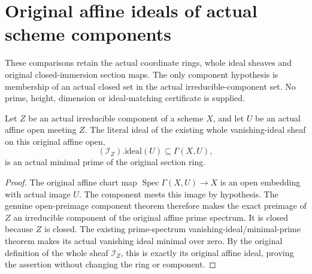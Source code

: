 \section{Original affine ideals of actual scheme components}
These comparisons retain the actual coordinate rings, whole ideal sheaves
and original closed-immersion section maps. The only component hypothesis
is membership of an actual closed set in the actual irreducible-component
set. No prime, height, dimension or ideal-matching certificate is supplied.

\begin{lemma}
\label{lem:pl-gauss-original-component-affine-minimal-prime}
\leanok
Let $Z$ be an actual irreducible component of a scheme $X$, and let $U$
be an actual affine open meeting $Z$. The literal ideal of the existing
whole vanishing-ideal sheaf on this original affine open,
\[
 (\mathcal I_Z).\mathrm{ideal}(U)\subseteq\Gamma(X,U),
\]
is an actual minimal prime of the original section ring.
\end{lemma}
\begin{proof}
The original affine chart map $\operatorname{Spec}\Gamma(X,U)\to X$
is an open embedding with actual image $U$. The component meets this
image by hypothesis. The genuine open-preimage component theorem
therefore makes the exact preimage of $Z$ an irreducible component of
the original affine prime spectrum. It is closed because $Z$ is closed.
The existing prime-spectrum vanishing-ideal/minimal-prime theorem makes
its actual vanishing ideal minimal over zero. By the original definition
of the whole sheaf $\mathcal I_Z$, this is exactly its original affine
ideal, proving the assertion without changing the ring or component.
\end{proof}

